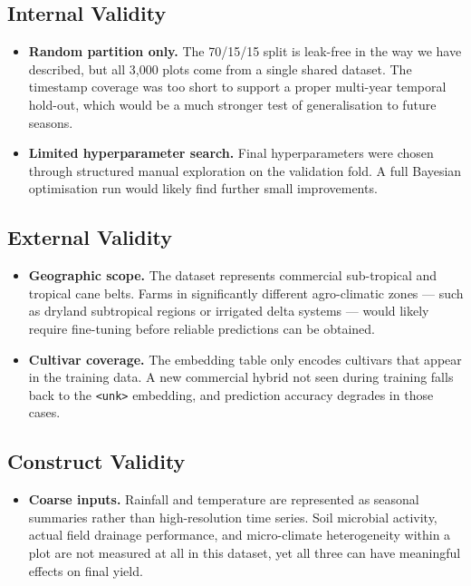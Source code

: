 \documentclass[conference,10pt,letterpaper]{IEEEtran}
\begin{document}
\subsection{Internal Validity}
\begin{itemize}
    \item \textbf{Random partition only.} The 70/15/15 split is leak-free in the way we have described, but all 3,000 plots come from a single shared dataset. The timestamp coverage was too short to support a proper multi-year temporal hold-out, which would be a much stronger test of generalisation to future seasons.
    \item \textbf{Limited hyperparameter search.} Final hyperparameters were chosen through structured manual exploration on the validation fold. A full Bayesian optimisation run would likely find further small improvements.
\end{itemize}

\subsection{External Validity}
\begin{itemize}
    \item \textbf{Geographic scope.} The dataset represents commercial sub-tropical and tropical cane belts. Farms in significantly different agro-climatic zones --- such as dryland subtropical regions or irrigated delta systems --- would likely require fine-tuning before reliable predictions can be obtained.
    \item \textbf{Cultivar coverage.} The embedding table only encodes cultivars that appear in the training data. A new commercial hybrid not seen during training falls back to the \texttt{<unk>} embedding, and prediction accuracy degrades in those cases.
\end{itemize}

\subsection{Construct Validity}
\begin{itemize}
    \item \textbf{Coarse inputs.} Rainfall and temperature are represented as seasonal summaries rather than high-resolution time series. Soil microbial activity, actual field drainage performance, and micro-climate heterogeneity within a plot are not measured at all in this dataset, yet all three can have meaningful effects on final yield.
\end{itemize}
\end{document}
